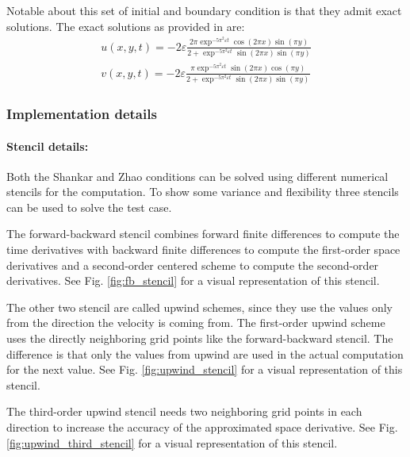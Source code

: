 Notable about this set of initial and boundary condition is that they admit exact solutions.
The exact solutions as provided in \citet{zhao2011new} are:
\\
\begin{equation}
\label{eq:exact_solution}
\begin{split}
u\left(x,y,t\right) = -2\varepsilon \frac{2 \pi \exp^{-5 \pi^2 \varepsilon t} \cos\left(2 \pi x\right) \sin\left(\pi y\right)}{2 + \exp^{-5 \pi^2 \varepsilon t}\sin\left(2 \pi x\right) \sin\left(\pi y\right)}
\\
v\left(x,y,t\right) = -2\varepsilon \frac{\pi \exp^{-5 \pi^2 \varepsilon t} \sin\left(2 \pi x\right) \cos\left(\pi y\right)}{2 + \exp^{-5 \pi^2 \varepsilon t}\sin\left(2 \pi x\right) \sin\left(\pi y\right)}
\end{split}
\end{equation}

\subsubsection{Implementation details}
\paragraph{Stencil details: }
Both the Shankar and Zhao conditions can be solved using different numerical stencils for the computation.
To show some variance and flexibility three stencils can be used to solve the test case.

The forward-backward stencil combines forward finite differences to compute the time derivatives with backward finite differences to compute the first-order space derivatives and a second-order centered scheme to compute the second-order derivatives.
See Fig. \ref{fig:fb_stencil} for a visual representation of this stencil.

The other two stencil are called upwind schemes, since they use the values only from the direction the velocity is coming from.
The first-order upwind scheme uses the directly neighboring grid points like the forward-backward stencil.
The difference is that only the values from upwind are used in the actual computation for the next value.
See Fig. \ref{fig:upwind_stencil} for a visual representation of this stencil.

The third-order upwind stencil needs two neighboring grid points in each direction to increase the accuracy of the approximated space derivative.
See Fig. \ref{fig:upwind_third_stencil} for a visual representation of this stencil.

